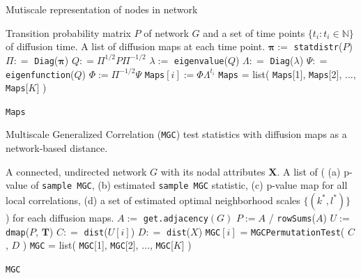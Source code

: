 \documentclass[12pt]{article}
\theoremstyle{definition}
\begin{document}
\begin{algorithm}[H]
	\caption{Mutiscale representation of nodes in network}
	\begin{algorithmic}[1]
		\Require Transition probability matrix $P$ of network $G$ and a set of time points $\{ t_{i}  : t_{i} \in \mathbb{N} \}$  of diffusion time. 
		\Ensure A list of diffusion maps at each time point.
		\State $\mathbf{\pi} :=$ \texttt{statdistr}($P$) 
		\State $\Pi : =$ \texttt{Diag}($\mathbf{\pi}$)
		\State $Q: = \Pi^{1/2} P \Pi^{-1/2}$ 
		\State $\lambda := $ \texttt{eigenvalue}($Q$)
		\State $\Lambda : =$ \texttt{Diag}($\lambda$)
		\State $\Psi : =$ \texttt{eigenfunction}($Q$) 
		\State $\Phi :=  \Pi^{-1/2} \Psi$
		\Begin
		\State \texttt{Maps}$[i] := \Phi \Lambda^{t_{i}}$  
		\End
		\EndFor
		\State \texttt{Maps} = list( \texttt{Maps}[1], \texttt{Maps}[2], $\ldots$, \texttt{Maps}[$K$]  )
		
		\Return \texttt{Maps}
		\EndFunction
	\end{algorithmic}
\end{algorithm}

\begin{algorithm}[H]
	\caption{Multiscale Generalized Correlation (\texttt{MGC}) test statistics with diffusion maps as a network-based distance.}
	\begin{algorithmic}[1]
		\Require A connected, undirected network $G$ with its nodal attributes $\mathbf{X}$.
		\Ensure A list of \big(  (a) p-value of \texttt{sample MGC}, (b) estimated \texttt{sample MGC} statistic, (c) p-value map for all local correlations, (d) a set of estimated optimal neighborhood scales $\{  (k^{*}, l^{*}  ) \}$  \big) for each diffusion maps.
		\State $A :=$ \texttt{get.adjacency}$(G)$
		\State $P := A $ / \texttt{rowSums}($A$) 
		\State $U :=$ \texttt{dmap}($P$, $\mathbf{T}$) 
		\Begin
		\State $C : =$  \texttt{dist}($U[i]$) 
		\State $D : =$ \texttt{dist}($X$) 
		\State \texttt{MGC}$[i]$ = \texttt{MGCPermutationTest}( $C$, $D$ ) 
		\End
		\EndFor
		\State \texttt{MGC} = list( \texttt{MGC}[1], \texttt{MGC}[2], $\ldots$, \texttt{MGC}[$K$]  )
		
		\Return \texttt{MGC}
		\EndFunction
	\end{algorithmic}
\end{algorithm}
\end{document}
